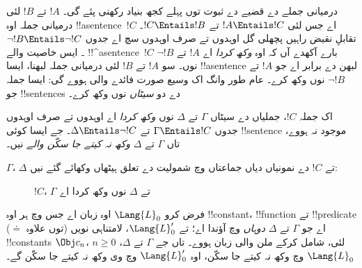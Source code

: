 \documentclass[../../../include/open-logic-section]{subfiles}
\begin{document}


درمیانی جملے دے قضیے دے ثبوت توں پہلے کجھ
بنیاد رکھنی پئے گی۔ $!A$ تے $!B$ لئی
درمیانی جملہ اوہ !!a{sentence}~$!C$ اے
جس لئی $!A \Entails !C$ تے
$!C \Entails !B$۔ تقابلِ نقیض راہیں
پچھلی گل اوہدوں تے صرف اوہدوں سچ اے جدوں
$\lnot !B \Entails \lnot
!C$۔ ایس خاصیت والے !!^a{sentence}~$!C$
بارے آکھدے آں کہ اوہ \emph{وکھ کردا} اے
$!A$ تے $\lnot !B$ نوں۔ سو $!A$ تے
$!B$ لئی درمیانی جملہ لبھنا، ایسا
!!a{sentence} لبھن دے برابر اے جو $!A$
تے $\lnot !B$ نوں وکھ کرے۔ عام طور وانگ
اک وسیع صورت فائدے والی ہووے گی: ایسا
جملہ جو !!{sentence}s دے دو \emph{سیٹاں}
نوں وکھ کرے۔

\begin{defn}
اک جملہ $!C$، جملیاں دے سیٹاں $\Gamma$
تے $\Delta$ نوں \emph{وکھ کردا} اے اوہدوں
تے صرف اوہدوں جدوں $\Gamma \Entails !C$
تے $\Delta \Entails
\lnot !C$۔ جے ایسا کوئی !!{sentence} موجود
نہ ہووے، تاں $\Gamma$ تے $\Delta$
\emph{وکھ نہ کیتے جا سکّن والے} نیں۔
\end{defn}

$\Gamma$، $\Delta$ تے $!C$ دے نمونیاں
دیاں جماعتاں وچ شمولیت دے تعلق ہیٹھاں
وکھائے گئے نیں:
\begin{figure}[h]
  \centering
  \caption{$!C$، $\Gamma$ تے $\Delta$ نوں وکھ کردا اے}
\end{figure}


\begin{lem}
فرض کرو $\Lang{L}_0$ اوہ زبان اے جس وچ
ہر اوہ !!{constant}، !!{function} تے
!!{predicate} ($\doteq$ توں علاوہ) اے جو
$\Gamma$ تے $\Delta$ \emph{دوہاں}
وچ آؤندا اے؛ تے $\Lang{L}'_0$،
لامتناہی نویں !!{constant}s $\Obj c_n$،
$n \ge 0$ لئی، شامل کرکے ملن والی
زبان ہووے۔ تاں جے $\Gamma$ تے $\Delta$،
$\Lang{L}_0$ وچ وکھ نہ کیتے جا سکّن،
اوہ $\Lang{L}'_0$ وچ وی وکھ نہ کیتے
جا سکّن گے۔
\end{lem}
\end{document}
